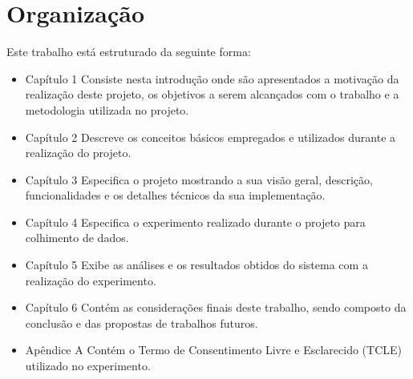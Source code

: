 
\section{Organização} %

 Este trabalho está estruturado da seguinte forma:
 
\begin{itemize}
 \item Capítulo 1
	\subitem Consiste nesta introdução onde são apresentados a motivação da realização deste projeto, os objetivos a serem alcançados com o trabalho e a metodologia utilizada no projeto.
 \item Capítulo 2
	\subitem Descreve os conceitos básicos empregados e utilizados durante a realização do projeto.
 \item Capítulo 3
	\subitem Especifica o projeto mostrando a sua visão geral, descrição, funcionalidades e os detalhes técnicos da sua implementação.
 \item Capítulo 4
	\subitem Especifica o experimento realizado durante o projeto para colhimento de dados.
 \item Capítulo 5
	\subitem Exibe as análises e os resultados obtidos do sistema com a realização do experimento.
 \item Capítulo 6
	\subitem Contém as considerações finais deste trabalho, sendo composto da conclusão e das propostas de trabalhos futuros.
 \item Apêndice A
	\subitem Contém o Termo de Consentimento Livre e Esclarecido (TCLE) utilizado no experimento.
\end{itemize}


